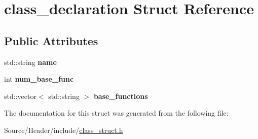 \hypertarget{structclass__declaration}{}\section{class\+\_\+declaration Struct Reference}
\label{structclass__declaration}
\subsection*{Public Attributes}
\begin{DoxyCompactItemize}
\item 
std\+::string {\bfseries name}\hypertarget{structclass__declaration_a229b8498e65c3e4507d277e21dc96dd3}{}\label{structclass__declaration_a229b8498e65c3e4507d277e21dc96dd3}

\item 
int {\bfseries num\+\_\+base\+\_\+func}\hypertarget{structclass__declaration_ac24e45ec54868aa640b6287779ebe74d}{}\label{structclass__declaration_ac24e45ec54868aa640b6287779ebe74d}

\item 
std\+::vector$<$ std\+::string $>$ {\bfseries base\+\_\+functions}\hypertarget{structclass__declaration_a057735aa678db0370f6c4d24791f78fd}{}\label{structclass__declaration_a057735aa678db0370f6c4d24791f78fd}

\end{DoxyCompactItemize}


The documentation for this struct was generated from the following file\+:\begin{DoxyCompactItemize}
\item 
Source/\+Header/include/\hyperlink{class__struct_8h}{class\+\_\+struct.\+h}\end{DoxyCompactItemize}
